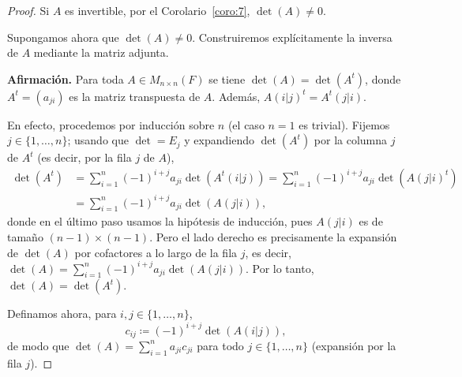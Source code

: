 \documentclass[12pt,a4paper]{book}
\newcommand{\llaves}[1]{\{#1\}}
\begin{document}
    \begin{proof}
        Si $A$ es invertible, por el Corolario~\ref{coro:7}, $\det(A) \neq 0$.

        Supongamos ahora que $\det(A) \neq 0$. Construiremos explícitamente la inversa de $A$ mediante la matriz adjunta.

        \textbf{Afirmación.} Para toda $A \in M_{n \times n}(F)$ se tiene $\det(A) = \det(A^{t})$, donde $A^{t} = (a_{ji})$ es la matriz transpuesta de $A$. Además, $A(i|j)^{t} = A^{t}(j|i)$.

        En efecto, procedemos por inducción sobre $n$ (el caso $n = 1$ es trivial). Fijemos $j \in \llaves{1, \dots, n}$; usando que $\det = E_{j}$ y expandiendo $\det(A^{t})$ por la columna $j$ de $A^{t}$ (es decir, por la fila $j$ de $A$),
        \begin{align*}
            \det(A^{t}) & = \sum_{i=1}^{n} (-1)^{i+j} a_{ji} \det(A^{t}(i|j)) = \sum_{i=1}^{n} (-1)^{i+j} a_{ji} \det(A(j|i)^{t}) \\
            & = \sum_{i=1}^{n} (-1)^{i+j} a_{ji} \det(A(j|i)),
        \end{align*}
        donde en el último paso usamos la hipótesis de inducción, pues $A(j|i)$ es de tamaño $(n-1) \times (n-1)$. Pero el lado derecho es precisamente la expansión de $\det(A)$ por cofactores a lo largo de la fila $j$, es decir,
        $\det(A) = \sum_{i=1}^{n} (-1)^{i+j} a_{ji} \det(A(j|i))$. Por lo tanto, $\det(A) = \det(A^{t})$.

        Definamos ahora, para $i, j \in \llaves{1, \dots, n}$,
        \begin{equation*}
            c_{ij} \coloneqq (-1)^{i+j} \det(A(i|j)),
        \end{equation*}
        de modo que $\det(A) = \sum_{i=1}^{n} a_{ji} c_{ji}$ para todo $j \in \llaves{1, \dots, n}$ (expansión por la fila $j$).


\end{proof}
\end{document}
